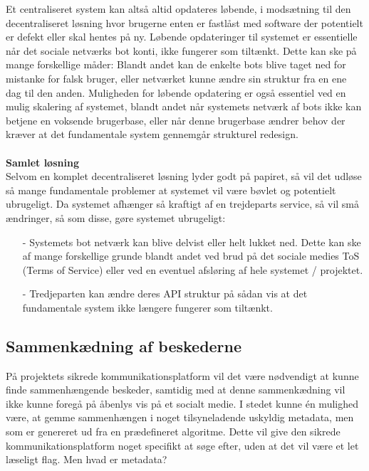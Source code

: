 Et centraliseret system kan altså altid opdateres løbende, i modsætning til den decentraliseret løsning hvor brugerne enten er fastlåst med software der potentielt er defekt eller skal hentes på ny. Løbende opdateringer til systemet er essentielle når det sociale netværks bot konti, ikke fungerer som tiltænkt. Dette kan ske på mange forskellige måder: Blandt andet kan de enkelte bots blive taget ned for mistanke for falsk bruger, eller netværket kunne ændre sin struktur fra en ene dag til den anden. Muligheden for løbende opdatering er også essentiel ved en mulig skalering af systemet, blandt andet når systemets netværk af bots ikke kan betjene en voksende brugerbase, eller når denne brugerbase ændrer behov der kræver at det fundamentale system gennemgår strukturel redesign.
\\\\
\textbf{Samlet løsning}\\
Selvom en komplet decentraliseret løsning lyder godt på papiret, så vil det udløse så mange fundamentale problemer at systemet vil være bøvlet og potentielt ubrugeligt. Da systemet afhænger så kraftigt af en trejdeparts service, så vil små ændringer, så som disse, gøre systemet ubrugeligt:
\begin{itemize}
    \item[-] Systemets bot netværk kan blive delvist eller helt lukket ned. Dette kan ske af mange forskellige grunde blandt andet ved brud på det sociale medies ToS (Terms of Service) eller ved en eventuel afsløring af hele systemet / projektet. 
    \item[-] Tredjeparten kan ændre deres API struktur på sådan vis at det fundamentale system ikke længere fungerer som tiltænkt.
\end{itemize}

\subsection{Sammenkædning af beskederne}
På projektets sikrede kommunikationsplatform vil det være nødvendigt at kunne finde sammenhængende beskeder, samtidig med at denne sammenkædning vil ikke kunne foregå på åbenlys vis på et socialt medie. I stedet kunne én mulighed være, at gemme sammenhængen i noget tilsyneladende uskyldig metadata, men som er genereret ud fra en prædefineret algoritme. Dette vil give den sikrede kommunikationsplatform noget specifikt at søge efter, uden at det vil være et let læseligt flag. Men hvad er metadata?

